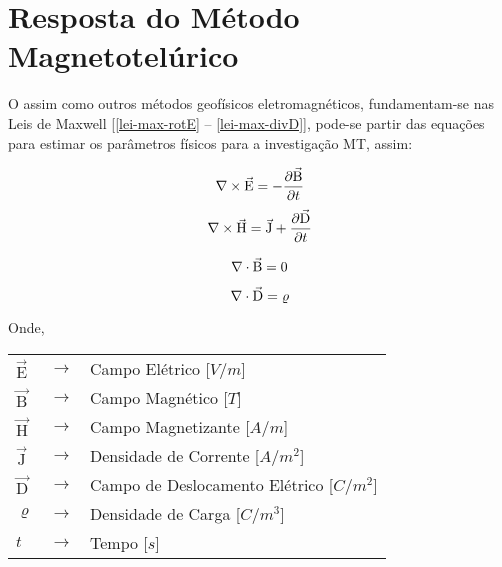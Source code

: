     \section{Resposta do Método Magnetotelúrico}

        O \mt{} assim como outros métodos geofísicos eletromagnéticos, fundamentam-se nas Leis de Maxwell [\ref{lei-max-rotE} -- \ref{lei-max-divD}], pode-se partir das equações para estimar os parâmetros físicos para a investigação MT, assim:
        
        \begin{equation}
            \label{lei-max-rotE}
            \nabla \times \vec{\textrm{E}} = - \dfrac{\partial \vec{\textrm{B}}}{\partial t}
        \end{equation}
        \begin{equation}
            \label{lei-max-rotH}
            \nabla \times \vec{\textrm{H}} = \vec{\textrm{J}} + \dfrac{\partial \vec{\textrm{D}}}{\partial t}
        \end{equation}

        \begin{equation}
            \label{lei-max-divB}
            \nabla \cdot \vec{\textrm{B}} = 0 
        \end{equation}

        \begin{equation}
            \label{lei-max-divD}
            \nabla \cdot \vec{\textrm{D}} = \varrho                
        \end{equation}
        
        \noindent Onde,
            
        {\footnotesize \noindent
            \begin{table}[H]
                \begin{tabular*}{1cm}{p{0.05cm}p{0.1cm}p{10cm}}
                    {\footnotesize $\vec{\textrm{E}}$}  & {\footnotesize $\rightarrow$} & {\footnotesize Campo Elétrico [$V/m$] }\\
                    {\footnotesize $\vec{\textrm{B}}$}  & {\footnotesize $\rightarrow$} & {\footnotesize Campo Magnético [$T$] }\\
                    {\footnotesize $\vec{\textrm{H}}$}  & {\footnotesize $\rightarrow$} & {\footnotesize Campo Magnetizante [$A/m$]} \\
                    {\footnotesize $\vec{\textrm{J}}$}  & {\footnotesize $\rightarrow$} & {\footnotesize Densidade de Corrente [$A/m^2$]} \\
                    {\footnotesize $\vec{\textrm{D}}$}  & {\footnotesize $\rightarrow$} & {\footnotesize Campo de Deslocamento Elétrico [$C/m^2$]} \\
                    {\footnotesize $\varrho$}           & {\footnotesize $\rightarrow$} & {\footnotesize Densidade de Carga [$C/m^3$]} \\
                    {\footnotesize $t$ }                & {\footnotesize $\rightarrow$} & {\footnotesize Tempo [$s$]}
                \end{tabular*}
            \end{table}}

